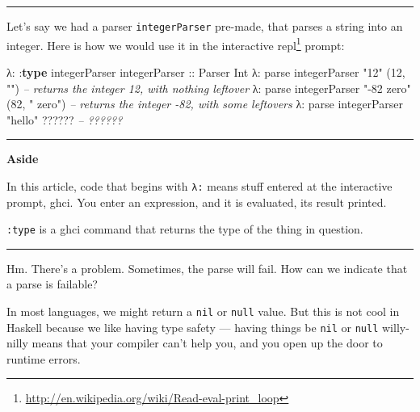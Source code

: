 \documentclass[]{article}
\newenvironment{Shaded}{}{}
\newcommand{\KeywordTok}[1]{\textcolor[rgb]{0.00,0.44,0.13}{\textbf{{#1}}}}
\newcommand{\DataTypeTok}[1]{\textcolor[rgb]{0.56,0.13,0.00}{{#1}}}
\newcommand{\DecValTok}[1]{\textcolor[rgb]{0.25,0.63,0.44}{{#1}}}
\newcommand{\StringTok}[1]{\textcolor[rgb]{0.25,0.44,0.63}{{#1}}}
\newcommand{\CommentTok}[1]{\textcolor[rgb]{0.38,0.63,0.69}{\textit{{#1}}}}
\newcommand{\OtherTok}[1]{\textcolor[rgb]{0.00,0.44,0.13}{{#1}}}
\newcommand{\FunctionTok}[1]{\textcolor[rgb]{0.02,0.16,0.49}{{#1}}}
\newcommand{\NormalTok}[1]{{#1}}
\renewcommand{\href}[2]{#2\footnote{\url{#1}}}
\begin{document}
\begin{center}\rule{0.5\linewidth}{\linethickness}\end{center}

Let's say we had a parser \texttt{integerParser} pre-made, that parses a string
into an integer. Here is how we would use it in the interactive
\href{http://en.wikipedia.org/wiki/Read-eval-print_loop}{repl} prompt:

\begin{Shaded}
\begin{Highlighting}[]
\NormalTok{λ}\FunctionTok{:} \FunctionTok{:}\KeywordTok{type} \NormalTok{integerParser}
\OtherTok{integerParser ::} \DataTypeTok{Parser} \DataTypeTok{Int}
\NormalTok{λ}\FunctionTok{:} \NormalTok{parse integerParser }\StringTok{"12"}
\NormalTok{(}\DecValTok{12}\NormalTok{, }\StringTok{""}\NormalTok{)                    }\CommentTok{-- returns the integer 12, with nothing leftover}
\NormalTok{λ}\FunctionTok{:} \NormalTok{parse integerParser }\StringTok{"-82 zero"}
\NormalTok{(}\DecValTok{82}\NormalTok{, }\StringTok{" zero"}\NormalTok{)               }\CommentTok{-- returns the integer -82, with some leftovers}
\NormalTok{λ}\FunctionTok{:} \NormalTok{parse integerParser }\StringTok{"hello"}
\FunctionTok{??????}                      \CommentTok{-- ??????}
\end{Highlighting}
\end{Shaded}

\begin{center}\rule{0.5\linewidth}{\linethickness}\end{center}

\textbf{Aside}

In this article, code that begins with \texttt{λ:} means stuff entered at the
interactive prompt, ghci. You enter an expression, and it is evaluated, its
result printed.

\texttt{:type} is a ghci command that returns the type of the thing in question.

\begin{center}\rule{0.5\linewidth}{\linethickness}\end{center}

Hm. There's a problem. Sometimes, the parse will fail. How can we indicate that
a parse is failable?

In most languages, we might return a \texttt{nil} or \texttt{null} value. But
this is not cool in Haskell because we like having type safety --- having things
be \texttt{nil} or \texttt{null} willy-nilly means that your compiler can't help
you, and you open up the door to runtime errors.
\end{document}
